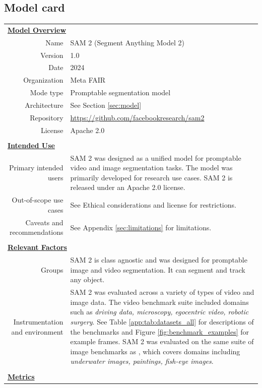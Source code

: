 \documentclass[]{fairmeta}
\begin{document}
\subsection{Model card}
\vspace{2em}
\begin{table}[!htbp]\centering\fontsize{7.5}{8.4}\selectfont
\begin{tabular*}{\linewidth}{r|p{10cm}}
\multicolumn{2}{l}{\bf\underline{Model Overview}} \\
Name & SAM 2 (Segment Anything Model 2) \\
Version & 1.0 \\
Date & 2024 \\
Organization & Meta FAIR \\
Mode type & Promptable segmentation model \\
Architecture & See Section \ref{sec:model} \\
Repository & \url{https://github.com/facebookresearch/sam2} \\
License & Apache 2.0 \\
\multicolumn{2}{c}{} \\
\multicolumn{2}{l}{\bf\underline{Intended Use}} \\
Primary intended users & SAM 2 was designed as a unified model for promptable video and image segmentation tasks. The model was primarily developed for research use cases. SAM 2 is released under an Apache 2.0 license. \\
Out-of-scope use cases & See Ethical considerations and license for restrictions. \\
Caveats and recommendations & See Appendix \ref{sec:limitations} for limitations. \\
\multicolumn{2}{c}{} \\
\multicolumn{2}{l}{\bf\underline{Relevant Factors}} \\
Groups & SAM 2 is class agnostic and was designed for promptable image and video segmentation. It can segment and track any object.\\
Instrumentation and environment & SAM 2 was evaluated across a variety of types of video and image data. The video benchmark suite included domains such as \textit{driving data, microscopy, egocentric video, robotic surgery}. See Table \ref{app:tab:datasets_all} for descriptions of the benchmarks and Figure \ref{fig:benchmark_examples} for example frames. SAM 2 was evaluated on the same suite of image benchmarks as \cite{kirillov2023segment}, which covers domains including \textit{underwater images, paintings, fish-eye images}.  \\
\multicolumn{2}{c}{} \\
\multicolumn{2}{l}{\bf\underline{Metrics}} \\


\end{tabular*}
\end{table}
\end{document}
